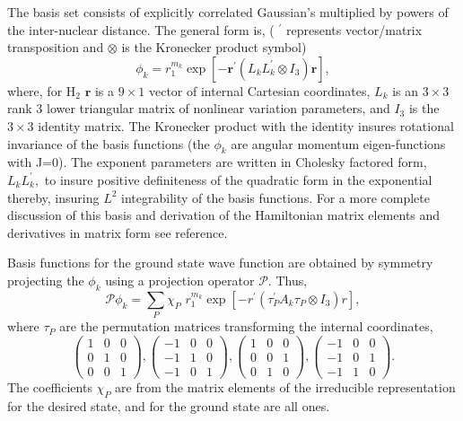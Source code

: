 \documentclass[12pt]{article}
\begin{document}
The basis set consists of explicitly correlated Gaussian's multiplied by
powers of the inter-nuclear distance. 
The general form is, ( $^{\prime }$ represents vector/matrix transposition
and $\otimes $ is the Kronecker product symbol) 
\begin{equation} \label{basis}
 \phi _k =
  r_{1}^{m_k} \exp \left[ -\mathbf{r}^{\prime }
      \left( L_kL_k^{\prime }\otimes I_3\right)\mathbf{r}\right],
\end{equation}
where, for H$_2$ $ \mathbf{r}$ is a $9\times 1$ vector of internal 
Cartesian coordinates, $L_k$ is
an $3\times 3$ rank $3$ lower triangular matrix of nonlinear variation
parameters, and $I_3$ is the $3\times 3$ identity matrix. The Kronecker
product with the identity insures rotational invariance of the basis
functions (the $\phi _k$ are angular momentum eigen-functions with J=0). The
exponent parameters are written in Cholesky factored form, 
$L_kL_k^{\prime },$ 
to insure positive definiteness of the quadratic form in the exponential
thereby, insuring $L^2$ integrability of the basis functions.
For a more complete discussion of
this basis and derivation of the Hamiltonian matrix elements and derivatives
in matrix form see reference\cite{Kinghorn99a}.

Basis functions for the ground state wave function 
are obtained by symmetry
projecting the $\phi _k$ using a  projection operator
$\mathcal{P}$. Thus,
\begin{equation}
\mathcal{P}\phi_{k}=\sum_{P}\chi_{P}\,\,r_{1}^{m_{k}}\exp\left[  -r^{\prime
}\left(  \tau_{P}^{\prime}A_{k}\tau_{P}\otimes I_{3}\right)  r\right],
\end{equation}
where $\tau_{P} $ are the permutation matrices transforming the
internal coordinates, 
\begin{equation}
\left( 
\begin{array}{ccc}
1 & 0 & 0 \\ 
0 & 1 & 0 \\
0 & 0 & 1
\end{array} 
\right),
\left( 
\begin{array}{ccc}
-1 & 0 & 0 \\ 
-1 & 1 & 0 \\
-1 & 0 & 1
\end{array} 
\right),
\left( 
\begin{array}{ccc}
1 & 0 & 0 \\ 
0 & 0 & 1 \\
0 & 1 & 0
\end{array} 
\right),
\left( 
\begin{array}{ccc}
-1 & 0 & 0 \\ 
-1 & 0 & 1 \\
-1 & 1 & 0
\end{array} 
\right).
\end{equation}
The coefficients $\chi_{P}$ are from the matrix elements of the irreducible
representation for the desired state, and for the ground state are all ones.
\end{document}

